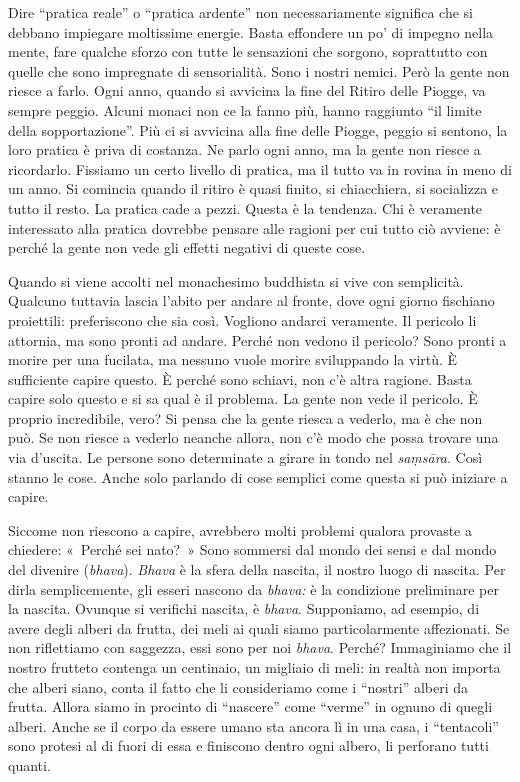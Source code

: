 Dire ``pratica reale'' o ``pratica ardente'' non necessariamente
significa che si debbano impiegare moltissime energie. Basta effondere
un po' di impegno nella mente, fare qualche sforzo con tutte le
sensazioni che sorgono, soprattutto con quelle che sono impregnate di
sensorialità. Sono i nostri nemici. Però la gente non riesce a farlo.
Ogni anno, quando si avvicina la fine del Ritiro delle Piogge, va sempre
peggio. Alcuni monaci non ce la fanno più, hanno raggiunto ``il limite
della sopportazione''. Più ci si avvicina alla fine delle Piogge, peggio
si sentono, la loro pratica è priva di costanza. Ne parlo ogni anno, ma
la gente non riesce a ricordarlo. Fissiamo un certo livello di pratica,
ma il tutto va in rovina in meno di un anno. Si comincia quando il
ritiro è quasi finito, si chiacchiera, si socializza e tutto il resto.
La pratica cade a pezzi. Questa è la tendenza. Chi è veramente
interessato alla pratica dovrebbe pensare alle ragioni per cui tutto ciò
avviene: è perché la gente non vede gli effetti negativi di queste cose.

Quando si viene accolti nel monachesimo buddhista si vive con
semplicità. Qualcuno tuttavia lascia l'abito per andare al fronte, dove
ogni giorno fischiano proiettili: preferiscono che sia così. Vogliono
andarci veramente. Il pericolo li attornia, ma sono pronti ad andare.
Perché non vedono il pericolo? Sono pronti a morire per una fucilata, ma
nessuno vuole morire sviluppando la virtù. È sufficiente capire questo.
È perché sono schiavi, non c'è altra ragione. Basta capire solo questo e
si sa qual è il problema. La gente non vede il pericolo. È proprio
incredibile, vero? Si pensa che la gente riesca a vederlo, ma è che non
può. Se non riesce a vederlo neanche allora, non c'è modo che possa
trovare una via d'uscita. Le persone sono determinate a girare in tondo
nel \emph{saṃsāra}. Così stanno le cose. Anche solo parlando di cose
semplici come questa si può iniziare a capire.

Siccome non riescono a capire, avrebbero molti problemi qualora provaste
a chiedere: «~Perché sei nato?~» Sono sommersi dal mondo dei sensi e dal
mondo del divenire (\emph{bhava}). \emph{Bhava} è la sfera della
nascita, il nostro luogo di nascita. Per dirla semplicemente, gli esseri
nascono da \emph{bhava:} è la condizione preliminare per la nascita.
Ovunque si verifichi nascita, è \emph{bhava}. Supponiamo, ad esempio, di
avere degli alberi da frutta, dei meli ai quali siamo particolarmente
affezionati. Se non riflettiamo con saggezza, essi sono per noi
\emph{bhava}. Perché? Immaginiamo che il nostro frutteto contenga un
centinaio, un migliaio di meli: in realtà non importa che alberi siano,
conta il fatto che li consideriamo come i ``nostri'' alberi da frutta.
Allora siamo in procinto di ``nascere'' come ``verme'' in ognuno di
quegli alberi. Anche se il corpo da essere umano sta ancora lì in una
casa, i ``tentacoli'' sono protesi al di fuori di essa e finiscono
dentro ogni albero, li perforano tutti quanti.

